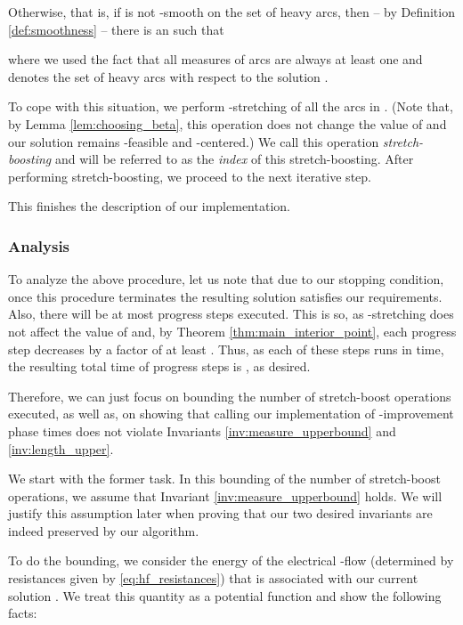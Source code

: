 \documentclass[11pt, letterpaper]{article}
\begin{document}
Otherwise, that is, if  is not -smooth on the set of heavy arcs, then -- by Definition \ref{def:smoothness} -- there is an  such that 

where we used the fact that all measures of arcs are always at least one and  denotes the set of heavy arcs with respect to the solution . 

To cope with this situation, we perform -stretching of all the arcs in . (Note that, by Lemma \ref{lem:choosing_beta}, this operation does not change the value of  and our solution remains -feasible and -centered.) We call this operation {\em stretch-boosting} and  will be referred to as the {\em index} of this stretch-boosting. After performing stretch-boosting, we proceed to the next iterative step. 

This finishes the description of our implementation. 

\subsubsection*{Analysis}

To analyze the above procedure, let us note that due to our stopping condition, once this procedure terminates the resulting solution  satisfies our requirements. Also, there will be at most  progress steps executed. This is so, as -stretching does not affect the value of  and, by Theorem \ref{thm:main_interior_point}, each progress step decreases  by a factor of at least . Thus, as each of these steps runs in  time, the resulting total time of progress steps is , as desired.

Therefore, we can just focus on bounding the number of stretch-boost operations executed, as well as, on showing that calling our implementation of -improvement phase  times does not violate Invariants \ref{inv:measure_upperbound} and \ref{inv:length_upper}. 

We start with the former task. In this bounding of the number of stretch-boost operations, we assume that Invariant \ref{inv:measure_upperbound} holds. We will justify this assumption later when proving that our two desired invariants are indeed preserved by our algorithm. 

To do the bounding, we consider the energy  of the electrical -flow  (determined by resistances  given by \eqref{eq:hf_resistances}) that is associated with our current solution . We treat this quantity as a potential function and show the following facts:
\end{document}
